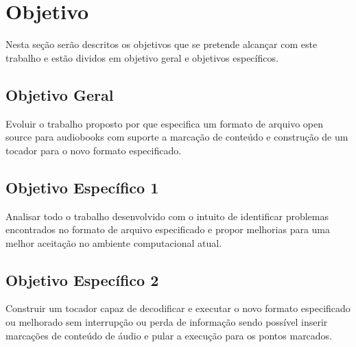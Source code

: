 \chapter{Objetivo}\label{cap2}

Nesta seção serão descritos os objetivos que se pretende alcançar com este trabalho e estão dividos em objetivo geral e objetivos específicos.

\section{Objetivo Geral}

Evoluir o trabalho proposto por \cite{herbert} que especifica um formato de arquivo open source para audiobooks com suporte a marcação de conteúdo e construção de um tocador para o novo formato especificado.

\section{Objetivo Específico 1}

Analisar todo o trabalho desenvolvido com o intuito de identificar problemas encontrados no formato de arquivo especificado e propor melhorias para uma melhor aceitação no ambiente computacional atual.

\section{Objetivo Específico 2}

Construir um tocador capaz de decodificar e executar o novo formato especificado ou melhorado sem interrupção ou perda de informação sendo possível inserir marcações de conteúdo de áudio e pular a execução para os pontos marcados.
